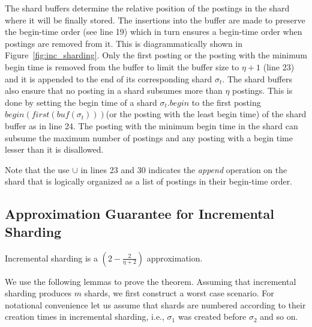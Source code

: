 The shard buffers determine the relative position of the postings in the shard where it will be finally stored. The insertions into the buffer are made to preserve the begin-time order (see line 19) which in turn ensures a begin-time order when postings are removed from it. This is diagrammatically shown in Figure~\ref{fig:inc_sharding}. Only the first posting or the posting with the minimum begin time is removed from the buffer to limit the buffer size to $\eta + 1$ (line 23) and it is appended to the end of its corresponding shard $\sigma_t$. The shard buffers also ensure that no posting in a shard subsumes more than $\eta$ postings. This is done by setting the begin time of a shard $\sigma_t.begin$ to the first posting $begin(first(bu\!f(\sigma_t)))$(or the posting with the least begin time) of the shard buffer as in line 24. The posting with the minimum begin time in the shard can subsume the maximum number of postings and any posting with a begin time lesser than it is disallowed.

Note that the use $\cup$ in lines 23 and 30 indicates the \emph{append} operation on the shard that is logically organized as a list of postings in their begin-time order.


\subsection{Approximation Guarantee for Incremental Sharding}
\label{proof:approx_guarantee}

\begin{theorem}
\label{thm:inc_sharding}  
Incremental sharding is a $(2- \frac{2}{\eta+2})$ approximation.
\end{theorem}

We use the following lemmas to prove the theorem.
Assuming that incremental sharding produces $m$ shards, we first construct a worst case scenario. For notational convenience let us assume that shards are numbered according to their creation times in incremental sharding, i.e., $\sigma_1$ was created before $\sigma_2$ and so on. 

